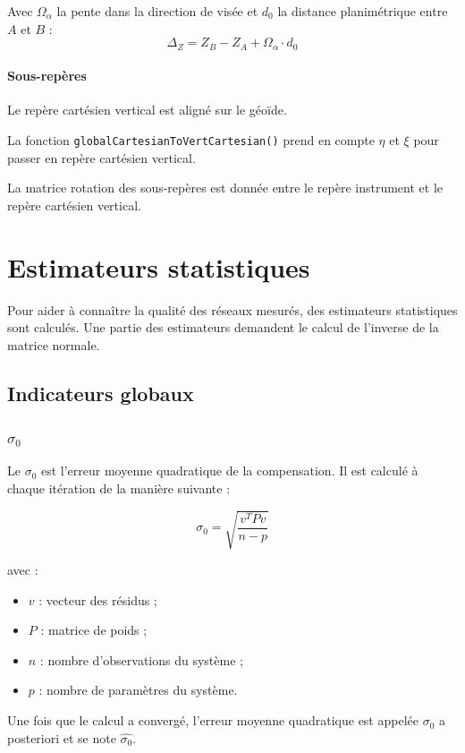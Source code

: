 \documentclass[french]{report}
\begin{document}
Avec $\Omega_\alpha$ la pente dans la direction de visée et $d_0$ la distance planimétrique entre $A$ et $B$ :
$$\Delta_Z = Z_B - Z_A + \Omega_\alpha \cdot d_0$$


\subsubsection{Sous-repères}
Le repère cartésien vertical est aligné sur le géoïde.

La fonction \texttt{globalCartesianToVertCartesian()} prend en compte $\eta$ et $\xi$ pour passer en repère cartésien vertical.

La matrice rotation des sous-repères est donnée entre le repère instrument et le repère cartésien vertical.

\chapter{Estimateurs statistiques}

Pour aider à connaître la qualité des réseaux mesurés, des estimateurs statistiques sont calculés.
Une partie des estimateurs demandent le calcul de l'inverse de la matrice normale.

\section{Indicateurs globaux}

\subsection{$\sigma_0$}

Le $\sigma_0$ est l'erreur moyenne quadratique de la compensation.
Il est calculé à chaque itération de la manière suivante :

$$\sigma_{0}= \sqrt{ \frac{ v^{T} P v }{n-p} }$$

avec :
\begin{itemize}
\item $v$ : vecteur des résidus ;
\item $P$ : matrice de poids ;
\item $n$ : nombre d'observations du système ;
\item $p$ : nombre de paramètres du système.
\end{itemize}

Une fois que le calcul a convergé, l'erreur moyenne quadratique est appelée $\sigma_0$ a posteriori et se note $\hat{\sigma_0}$.
\end{document}
